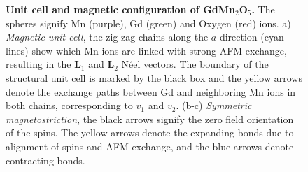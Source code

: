 \begin{figure}
	\caption{\label{fig:GdMn2O5_unit_cell}{\bf Unit cell and magnetic configuration of GdMn$_2$O$_5$.} The spheres signify Mn (purple), Gd (green) and Oxygen (red) ions. a) {\it Magnetic unit cell}, the zig-zag chains along the $a$-direction (cyan lines) show which Mn ions are linked with strong AFM exchange, resulting in the $\bm{L}_1$ and $\bm{L}_2$ N\'eel vectors. The boundary of the structural unit cell is marked by the black box and the yellow arrows denote the exchange paths between Gd and neighboring Mn ions in both chains, corresponding to $v_1$ and $v_2$. (b-c) {\it Symmetric magnetostriction}, the black arrows signify the zero field orientation of the spins. The yellow arrows denote the expanding bonds due to alignment of spins and AFM exchange, and the blue arrows denote contracting bonds.}
\end{figure}
